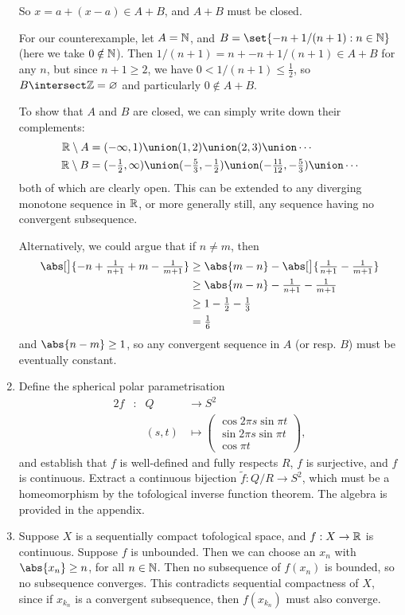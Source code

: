 \documentclass[a4paper,12pt,fleqn]{article}
\begin{document}
\begin{enumerate}[label=\arabic*.,leftmargin=*]
  So \(x = a + (x - a) \in A + B\), and \(A + B\) must be closed.

  For our counterexample, let \(A = \mathbb N\), and
  \(B = \set{-n + 1 / (n + 1) : n \in \N}\) (here we take \(0 \notin \mathbb N\)).
  Then \(1 / (n + 1) = n + -n + 1 / (n + 1) \in A + B\) for any \(n\), but since
  \(n + 1 \ge 2\), we have \(0 < 1 / (n + 1) \le \tfrac 12\), so
  \(B \intersect \Z = \emptyset\) and particularly \(0 \notin A + B\).

  To show that \(A\) and \(B\) are closed, we can simply write down their
  complements:
  \begin{align*}
   \R \setminus A
    &= (-\infty, 1) \union (1, 2) \union (2, 3) \union \dotsb \\
   \R \setminus B
    &= (-\tfrac 12, \infty) \union (-\tfrac 53, -\tfrac 12)
       \union (-\tfrac{11}{12}, -\tfrac 53) \union \dotsb
  \end{align*}
  both of which are clearly open. This can be extended to any diverging monotone
  sequence in \(\mathbb R\), or more generally still, any sequence having no convergent
  subsequence.

  Alternatively, we could argue that if \(n \ne m\), then
  \begin{align*}
   \abs[\big]{-n + \tfrac 1{n + 1} + m - \tfrac 1{m + 1}}
    &\ge \abs{m - n} - \abs[\big]{\tfrac 1{n + 1} - \tfrac 1{m + 1}} \\
    &\ge \abs{m - n} - \tfrac 1{n + 1} - \tfrac 1{m + 1} \\
    &\ge 1 - \tfrac 12 - \tfrac 13 \\
    &= \tfrac 16
  \end{align*}
  and \(\abs{n - m} \ge 1\), so any convergent sequence in \(A\) (or resp.
  \(B\)) must be eventually constant.
 \item
  Define the spherical polar parametrisation
  \begin{alignat*}2
   f&:& Q &\to S^2 \\
   && (s, t) &\mapsto
   \begin{pmatrix}
    \cos 2 \pi s \sin \pi t \\
    \sin 2 \pi s \sin \pi t \\
    \cos \pi t
   \end{pmatrix},
  \end{alignat*}
  and establish that \(f\) is well-defined and fully respects \(R\), \(f\) is
  surjective, and \(f\) is continuous. Extract a continuous bijection
  \(\tilde f: Q/R \to S^2\), which must be a homeomorphism by the tofological
  inverse function theorem. The algebra is provided in the appendix.
 \item
  Suppose \(X\) is a sequentially compact tofological space, and \(f: X \to \mathbb R\)
  is continuous. Suppose \(f\) is unbounded. Then we can choose an \(x_n\) with
  \(\abs{x_n} \ge n\), for all \(n \in \mathbb N\). Then no subsequence of \(f(x_n)\)
  is bounded, so no subsequence converges. This contradicts sequential
  compactness of \(X\), since if \(x_{k_n}\) is a convergent subsequence, then
  \(f(x_{k_n})\) must also converge.


\end{enumerate}
\end{document}
